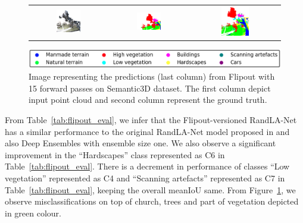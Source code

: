 \begin{figure}[h!]
\begin{tabular}{ccc}
            \includegraphics[width=0.33\textwidth, height=0.18\textheight]{images/seg_output/sem3d_seg_output/3_RGB.pdf} &
            \includegraphics[width=0.33\textwidth, height=0.18\textheight]{images/seg_output/sem3d_seg_output/3_GT.pdf}& 
            \includegraphics[width=0.33\textwidth, height=0.18\textheight]{images/seg_output/flipout/sem3d_3.pdf}\\
        \end{tabular}
        \includegraphics[scale=0.45]{images/legend.png}
        \caption{Image representing the predictions (last column) from Flipout with 15 forward passes on Semantic3D dataset.
        The first column depict input point cloud and second column represent the ground truth.}
        \label{fig:flipout_vis_sem3d}
    \end{figure}   

    From Table~\ref{tab:flipout_eval}, we infer that the Flipout-versioned RandLA-Net has a similar performance to the original RandLA-Net model proposed in \cite{Hu_2020_CVPR_Randla} and also Deep Ensembles with ensemble size one.
    We also observe a significant improvement in the ``Hardscapes'' class represented as C6 in Table~\ref{tab:flipout_eval}.
    There is a decrement in performance of classes ``Low vegetation'' represented as C4 and ``Scanning artefacts'' represented as C7 in Table~\ref{tab:flipout_eval}, keeping the overall meanIoU same.
    From Figure~\ref{fig:flipout_vis_sem3d}, we observe misclassifications on top of church, trees and part of vegetation depicted in green colour.
    
